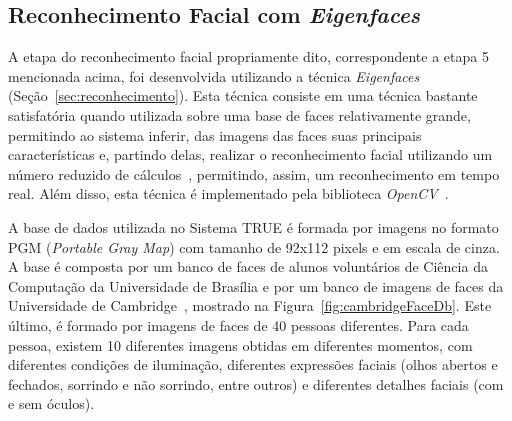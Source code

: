 	\subsection{Reconhecimento Facial com \textit{Eigenfaces}}

		A etapa do reconhecimento facial propriamente dito, correspondente a etapa 5 mencionada acima, foi desenvolvida utilizando a técnica \textit{Eigenfaces} (Seção~\ref{sec:reconhecimento}). Esta técnica consiste em uma técnica bastante satisfatória quando utilizada sobre uma base de faces relativamente grande, permitindo ao sistema inferir, das imagens das faces suas principais características e, partindo delas, realizar o reconhecimento facial utilizando um número reduzido de cálculos~\cite{artigo-eigenface}, permitindo, assim, um reconhecimento em tempo real. Além disso, esta técnica é implementado pela biblioteca \textit{OpenCV}~\cite{opencv_library}.

		A base de dados utilizada no Sistema TRUE é formada por imagens no formato PGM (\textit{Portable Gray Map}) com tamanho de 92x112 pixels e em escala de cinza. A base é composta por um banco de faces de alunos voluntários de Ciência da Computação da Universidade de Brasília e por um banco de imagens de faces da Universidade de Cambridge~\cite{cambridgeFaceDb}, mostrado na Figura~\ref{fig:cambridgeFaceDb}. Este último, é formado por imagens de faces de 40 pessoas diferentes. Para cada pessoa, existem 10 diferentes imagens obtidas em diferentes momentos, com diferentes condições de iluminação, diferentes expressões faciais (olhos abertos e fechados, sorrindo e não sorrindo, entre outros) e diferentes detalhes faciais (com e sem óculos). 


